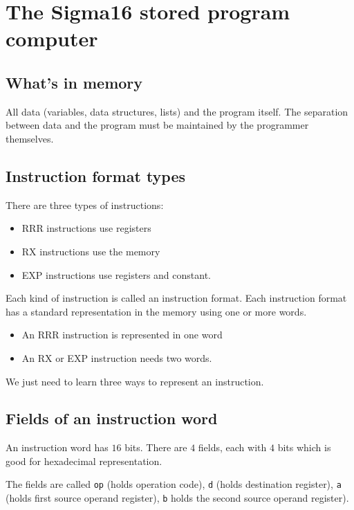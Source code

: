 \section{The Sigma16 stored program computer}\label{sec:the_sigma16_stored_program_computer}

\subsection{What's in memory}\label{sub:what_s_in_memory}

All data (variables, data structures, lists) and the program itself.
The separation between data and the program must be maintained by the programmer themselves.

\subsection{Instruction format types}\label{sub:instruction_format_types}

There are three types of instructions:
\begin{itemize}
	\item RRR instructions use registers
	\item RX instructions use the memory
	\item EXP instructions use registers and constant.
\end{itemize}
%
Each kind of instruction is called an instruction format.
Each instruction format has a standard representation in the memory using one or more words.
\begin{itemize}
	\item An RRR instruction is represented in one word
	\item An RX or EXP instruction needs two words.
\end{itemize}
%
We just need to learn three ways to represent an instruction.

\subsection{Fields of an instruction word}\label{sub:fields_of_an_instruction_word}

An instruction word has \(16\) bits.
There are \(4\) fields, each with \(4\) bits which is good for hexadecimal representation.

The fields are called \texttt{op} (holds operation code), \texttt{d} (holds destination register), \texttt{a} (holds first source operand register), \texttt{b} holds the second source operand register).

